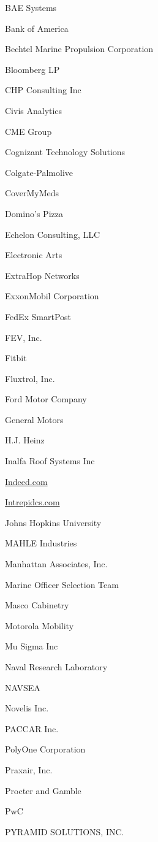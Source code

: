 \documentclass[twoside]{article}
\begin{document}
\begin{center}
\begin{multicols}{5}
\begin{FlushLeft}
\begin{compactitem}
\item BAE Systems
\item Bank of America
\item Bechtel Marine Propulsion Corporation
\item Bloomberg LP
\item CHP Consulting Inc
\item Civis Analytics
\item CME Group
\item Cognizant Technology Solutions
\item Colgate-Palmolive
\item CoverMyMeds
\item Domino's Pizza
\item Echelon Consulting, LLC
\item Electronic Arts
\item ExtraHop Networks
\item ExxonMobil Corporation
\item FedEx SmartPost
\item FEV, Inc.
\item Fitbit
\item Fluxtrol, Inc.
\item Ford Motor Company
\item General Motors
\item H.J. Heinz
\item Inalfa Roof Systems Inc
\item \url{Indeed.com}
\item \url{Intrepidcs.com}
\item Johns Hopkins University
\item MAHLE Industries
\item Manhattan Associates, Inc.
\item Marine Officer Selection Team
\item Masco Cabinetry
\item Motorola Mobility
\item Mu Sigma Inc
\item Naval Research Laboratory
\item NAVSEA
\item Novelis Inc.
\item PACCAR Inc.
\item PolyOne Corporation
\item Praxair, Inc.
\item Procter and Gamble
\item PwC
\item PYRAMID SOLUTIONS, INC.

\end{compactitem}
\end{FlushLeft}
\end{multicols}
\end{center}
\end{document}
